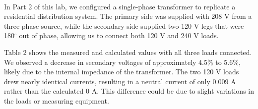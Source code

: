 
\paragraph{} In Part 2 of this lab, we configured a single-phase transformer to replicate a residential distribution system.
The primary side was supplied with 208 V from a three-phase source, while the secondary side supplied two 120 V legs that were 180$^\circ$
out of phase, allowing us to connect both 120 V and 240 V loads.

Table 2 shows the measured and calculated values with all three loads connected. We observed a decrease in secondary voltages of approximately 4.5\%
to 5.6\%, likely due to the internal impedance of the transformer. The two 120 V loads drew nearly identical currents, resulting in a neutral current
of only 0.009 A rather than the calculated 0 A. This difference could be due to slight variations in the loads or measuring equipment.
\clearpage
